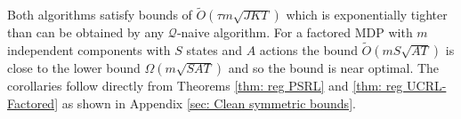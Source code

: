 \documentclass{article}
\newcommand{\Exp}{\mathds{E}}
\newcommand{\Xc}{\mathcal{X}}
\newcommand{\Qc}{\mathcal{Q}}
\newcommand{\Sc}{\mathcal{S}}
\begin{document}
Both algorithms satisfy bounds of $\tilde{O}(\tau m \sqrt{JKT})$ which is exponentially tighter than can be obtained by any $\Qc$-naive algorithm.
For a factored MDP with $m$ independent components with $S$ states and $A$ actions the bound $\tilde{O}(m S \sqrt{AT})$ is close to the lower bound $\Omega(m\sqrt{SAT})$ and so the bound is near optimal.
The corollaries follow directly from Theorems \ref{thm: reg PSRL} and \ref{thm: reg UCRL-Factored} as shown in Appendix \ref{sec: Clean symmetric bounds}.





\end{document}
